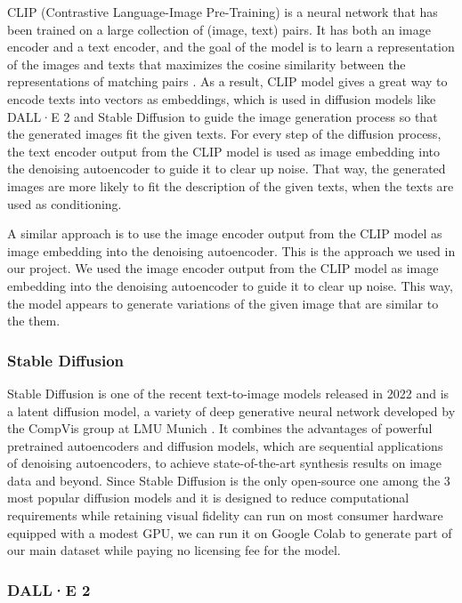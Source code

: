 \documentclass[11pt]{article}
\begin{document}
CLIP (Contrastive Language-Image Pre-Training) is a neural network that has been trained on a large collection of (image, text) pairs. It has both an image encoder and a text encoder, and the goal of the model is to learn a representation of the images and texts that maximizes the cosine similarity between the representations of matching pairs \cite{radford2021learning}. As a result, CLIP model gives a great way to encode texts into vectors as embeddings, which is used in diffusion models like DALL·E 2 and Stable Diffusion to guide the image generation process so that the generated images fit the given texts. For every step of the diffusion process, the text encoder output from the CLIP model is used as image embedding into the denoising autoencoder to guide it to clear up noise. That way, the generated images are more likely to fit the description of the given texts, when the texts are used as conditioning.

A similar approach is to use the image encoder output from the CLIP model as image embedding into the denoising autoencoder. This is the approach we used in our project. We used the image encoder output from the CLIP model as image embedding into the denoising autoencoder to guide it to clear up noise. This way, the model appears to generate variations of the given image that are similar to the them.

\subsubsection{Stable Diffusion}

Stable Diffusion is one of the recent text-to-image models released in 2022 and is a latent diffusion model, a variety of deep generative neural network developed by the CompVis group at LMU Munich \cite{rombach2022high}. It combines the advantages of powerful pretrained autoencoders and diffusion models, which are sequential applications of denoising autoencoders, to achieve state-of-the-art synthesis results on image data and beyond. Since Stable Diffusion is the only open-source one among the 3 most popular diffusion models and it is designed to reduce computational requirements while retaining visual fidelity can run on most consumer hardware equipped with a modest GPU, we can run it on Google Colab to generate part of our main dataset while paying no licensing fee for the model.

\subsubsection{DALL·E 2}
\end{document}
